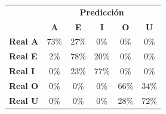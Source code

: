 \begin{tabular}{lccccc}
\toprule
 & \multicolumn{5}{c}{\textbf{Predicción}} \\
 & \textbf{A} & \textbf{E} & \textbf{I} & \textbf{O} & \textbf{U} \\
\midrule
\textbf{Real A} & \cellcolor[rgb]{0.49,0.49,1.00} \color{white} 73\% & \cellcolor[rgb]{0.81,0.81,1.00}  27\% & \cellcolor[rgb]{1.00,1.00,1.00}  0\% & \cellcolor[rgb]{1.00,1.00,1.00}  0\% & \cellcolor[rgb]{1.00,1.00,1.00}  0\% \\
\textbf{Real E} & \cellcolor[rgb]{0.99,0.99,1.00}  2\% & \cellcolor[rgb]{0.45,0.45,1.00} \color{white} 78\% & \cellcolor[rgb]{0.86,0.86,1.00}  20\% & \cellcolor[rgb]{1.00,1.00,1.00}  0\% & \cellcolor[rgb]{1.00,1.00,1.00}  0\% \\
\textbf{Real I} & \cellcolor[rgb]{1.00,1.00,1.00}  0\% & \cellcolor[rgb]{0.84,0.84,1.00}  23\% & \cellcolor[rgb]{0.46,0.46,1.00} \color{white} 77\% & \cellcolor[rgb]{1.00,1.00,1.00}  0\% & \cellcolor[rgb]{1.00,1.00,1.00}  0\% \\
\textbf{Real O} & \cellcolor[rgb]{1.00,1.00,1.00}  0\% & \cellcolor[rgb]{1.00,1.00,1.00}  0\% & \cellcolor[rgb]{1.00,1.00,1.00}  0\% & \cellcolor[rgb]{0.54,0.54,1.00} \color{white} 66\% & \cellcolor[rgb]{0.76,0.76,1.00}  34\% \\
\textbf{Real U} & \cellcolor[rgb]{1.00,1.00,1.00}  0\% & \cellcolor[rgb]{1.00,1.00,1.00}  0\% & \cellcolor[rgb]{1.00,1.00,1.00}  0\% & \cellcolor[rgb]{0.80,0.80,1.00}  28\% & \cellcolor[rgb]{0.50,0.50,1.00} \color{white} 72\% \\
\bottomrule
\end{tabular}